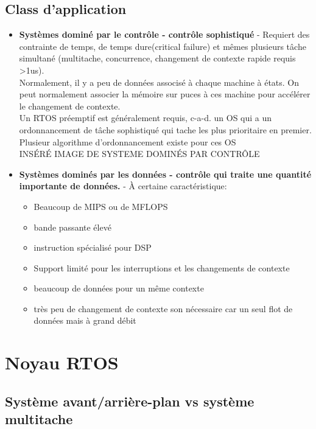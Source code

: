 \documentclass[oneside]{book}
\begin{document}
    \section{Class d'application}
    \begin{itemize}
        \item \textbf{Systèmes dominé par le contrôle - contrôle sophistiqué} - Requiert des contrainte de temps, de temps dure(critical failure) et mêmes plusieurs tâche simultané (multitache, concurrence, changement de contexte rapide requis >1us).\\
        
        Normalement, il y a peu de données associsé à chaque machine à états. On peut normalement associer la mémoire sur puces à ces machine pour accélérer le changement de contexte.\\
        
        Un RTOS préemptif est généralement requis, c-a-d. un OS qui a un ordonnancement de tâche sophistiqué qui tache les plus prioritaire en premier. Plusieur algorithme d'ordonnancement existe pour ces OS\\
        
        INSÉRÉ IMAGE DE SYSTEME DOMINÉS PAR CONTRÔLE
        \item \textbf{Systèmes dominés par les données - contrôle qui traite une quantité importante de données.} - À certaine caractéristique:
        \begin{itemize}
            \item Beaucoup de MIPS ou de MFLOPS
            \item bande passante élevé
            \item instruction spécialisé pour DSP
            \item Support limité pour les interruptions et les changements de contexte
            \item beaucoup de données pour un même contexte
            \item très peu de changement de contexte son nécessaire car un seul flot de données mais à grand débit
        \end{itemize}
    \end{itemize}
    
    \chapter{Noyau RTOS}
    \section{Système avant/arrière-plan vs système multitache}
\end{document}
